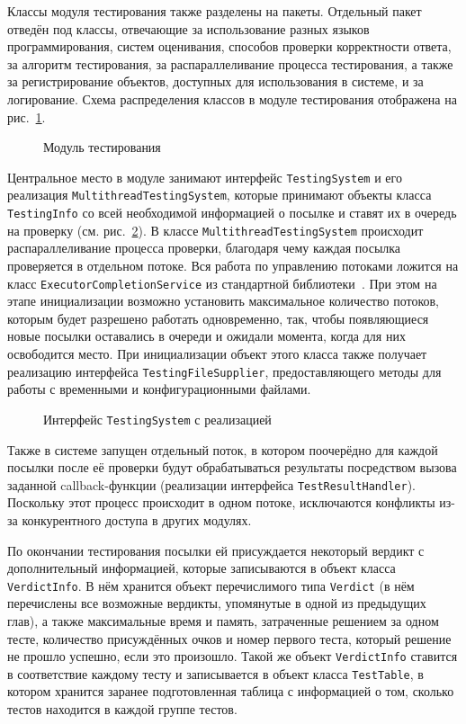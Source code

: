 Классы модуля тестирования также разделены на пакеты. Отдельный пакет отведён под классы, отвечающие за использование разных языков программирования, систем оценивания, способов проверки корректности ответа, за алгоритм тестирования, за распараллеливание процесса тестирования, а также за регистрирование объектов, доступных для использования в системе, и за логирование. Схема распределения классов в модуле тестирования отображена на рис.~\ref{package_diagram_testing}.

\begin{figure}[h]
\caption{Модуль тестирования}
\label{package_diagram_testing}
\end{figure}

Центральное место в модуле занимают интерфейс \texttt{Testing\-System} и его реализация \texttt{Multithread\-Testing\-System}, которые принимают объекты класса \texttt{Tes\-ting\-Info} со всей необходимой информацией о посылке и ставят их в очередь на проверку (см. рис.~\ref{class_diagram_multithread}). В классе \texttt{Multithread\-Testing\-System} происходит распараллеливание процесса проверки, благодаря чему каждая посылка проверяется в отдельном потоке. Вся работа по управлению потоками ложится на класс \texttt{Executor\-Completion\-Service} из стандартной библиотеки~\cite{cornell1}. При этом на этапе инициализации возможно установить максимальное количество потоков, которым будет разрешено работать одновременно, так, чтобы появляющиеся новые посылки оставались в очереди и ожидали момента, когда для них освободится место. При инициализации объект этого класса также получает реализацию интерфейса \texttt{Testing\-File\-Supplier}, предоставляющего методы для работы с временными и конфигурационными файлами.

\begin{figure}[h]
\caption{Интерфейс \texttt{TestingSystem} с реализацией}
\label{class_diagram_multithread}
\end{figure}

Также в системе запущен отдельный поток, в котором поочерёдно для каждой посылки после её проверки будут обрабатываться результаты посредством вызова заданной callback-функции (реализации интерфейса \texttt{Test\-Result\-Handler}). Поскольку этот процесс происходит в одном потоке, исключаются конфликты из-за конкурентного доступа в других модулях.

По окончании тестирования посылки ей присуждается некоторый вердикт с дополнительный информацией, которые записываются в объект класса \texttt{Verdict\-Info}. В нём хранится объект перечислимого типа \texttt{Verdict} (в нём перечислены все возможные вердикты, упомянутые в одной из предыдущих глав), а также максимальные время и память, затраченные решением за одном тесте, количество присуждённых очков и номер первого теста, который решение не прошло успешно, если это произошло. Такой же объект \texttt{Verdict\-Info} ставится в соответствие каждому тесту и записывается в объект класса \texttt{Test\-Table}, в котором хранится заранее подготовленная таблица с информацией о том, сколько тестов находится в каждой группе тестов.

